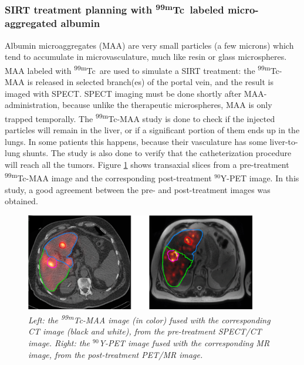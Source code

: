 \subsubsection{SIRT treatment planning with \textsuperscript{99m}Tc\ labeled
  micro-aggregated albumin}
Albumin microaggregates (MAA) are very small particles (a few microns)
which tend to accumulate in microvasculature, much like resin or glass
microspheres. MAA labeled with \textsuperscript{99m}Tc\ are used to simulate a SIRT
treatment: the \textsuperscript{99m}Tc-MAA is released in selected branch(es) of
the portal vein, and the result is imaged with SPECT. SPECT imaging
must be done shortly after MAA-administration, because unlike the
therapeutic microspheres, MAA is only trapped temporally. The
\textsuperscript{99m}Tc-MAA study is done to check if the injected particles will
remain in the liver, or if a significant portion of them ends up in
the lungs. In some patients this happens, because their vasculature
has some liver-to-lung shunts. The study is also done to verify that
the catheterization procedure will reach all the tumors.  Figure
\ref{fig:SirtMaaY} shows transaxial slices from a pre-treatment
\textsuperscript{99m}Tc-MAA image and the corresponding post-treatment $^{90}$Y-PET
image. In this study, a good agreement between the pre- and
post-treatment images was obtained. 
%
\begin{figure}[h]
\centering
\includegraphics[width=0.9\textwidth]{figs/fig_SIRT_Tc_Y.png}
\caption{\label{fig:SirtMaaY} \emph{Left: the \textsuperscript{99m}Tc-MAA
    image (in color) fused with the corresponding CT image (black and
    white), from the pre-treatment SPECT/CT image. Right: the
    $^{90}$Y-PET image fused with the corresponding MR
    image, from the post-treatment PET/MR image.}}
\end{figure}
%

